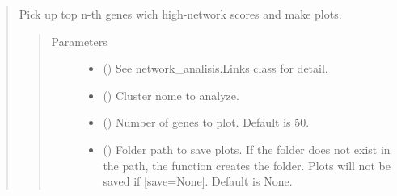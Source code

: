 \documentclass[letterpaper,10pt,english]{sphinxmanual}
\begin{document}
\begin{quote}
\begin{fulllineitems}
\begin{fulllineitems}
\begin{quote}
\begin{description}
\begin{itemize}
\end{itemize}

\end{description}\end{quote}

\end{fulllineitems}


\begin{fulllineitems}
\label{\detokenize{modules/celloracle.network_analysis:celloracle.network_analysis.Links.plot_scores_as_rank}}
Pick up top n-th genes wich high-network scores and make plots.
\begin{quote}\begin{description}
\item[{Parameters}] \leavevmode\begin{itemize}
\item {} 
 ({\hyperref[\detokenize{modules/celloracle:celloracle.Links}]{}}) \textendash{} See network\_analisis.Links class for detail.

\item {} 
 () \textendash{} Cluster nome to analyze.

\item {} 
 () \textendash{} Number of genes to plot. Default is 50.

\item {} 
 () \textendash{} Folder path to save plots. If the folder does not exist in the path, the function creates the folder.
Plots will not be saved if {[}save=None{]}. Default is None.

\end{itemize}

\end{description}\end{quote}

\end{fulllineitems}


\end{fulllineitems}
\end{quote}
\end{document}
